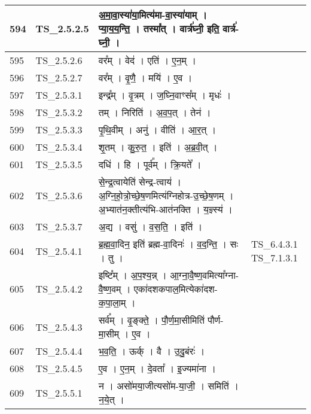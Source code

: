 \documentclass[17pt]{extarticle}
\begin{document}
\begin{longtable}{||p{0.4in}||p{0.9in}||p{4.0in}||p{0.9in}||}
            594 & TS\_2.5.2.5 & अ॒मा॒वा॒स्या॑या॒मित्य॑मा{-}वा॒स्या॑याम्   ।   प्या॒य॒य॒न्ति॒   ।   तस्मा᳚त्   ।   वार्त्र॑घ्नी॒ इति॒ वार्त्र॑{-}घ्नी॒   ।    &      \\
        \hline
            595 & TS\_2.5.2.6 & वर᳚म्   ।   वेद॑   ।   एति॑   ।   ए॒न॒म्   ।    &      \\
        \hline
            596 & TS\_2.5.2.7 & वर᳚म्   ।   वृ॒णै॒   ।   मयि॑   ।   ए॒व   ।    &      \\
        \hline
            597 & TS\_2.5.3.1 & इन्द्र᳚म्   ।   वृ॒त्रम्   ।   ज॒घ्नि॒वाꣳस᳚म्   ।   मृधः॑   ।    &      \\
        \hline
            598 & TS\_2.5.3.2 & तम्   ।   निरिति॑   ।   अ॒व॒प॒त्   ।   तेन॑   ।    &      \\
        \hline
            599 & TS\_2.5.3.3 & पृ॒थि॒वीम्   ।   अनु॑   ।   वीति॑   ।   आ॒र॒त्   ।    &      \\
        \hline
            600 & TS\_2.5.3.4 & शृ॒तम्   ।   कु॒रु॒त॒   ।   इति॑   ।   अ॒ब्र॒वी॒त्   ।    &      \\
        \hline
            601 & TS\_2.5.3.5 & दधि॑   ।   हि   ।   पूर्व᳚म्   ।   क्रि॒यते᳚   ।    &      \\
        \hline
            602 & TS\_2.5.3.6 & से॒न्द्र॒त्वायेति॑ सेन्द्र{-}त्वाय॑   ।   अ॒ग्नि॒हो॒त्रो॒च्छे॒ष॒णमित्य॑ग्निहोत्र{-}उ॒च्छे॒ष॒णम्   ।   अ॒भ्यात॑न॒क्तीत्य॑भि{-}आत॑नक्ति   ।   य॒ज्ञ्स्य॑   ।    &      \\
        \hline
            603 & TS\_2.5.3.7 & अ॒द्य   ।   वसु॑   ।   व॒स॒ति॒   ।   इति॑   ।    &      \\
        \hline
            604 & TS\_2.5.4.1 & ब्र॒ह्म॒वा॒दिन॒ इति॑ ब्रह्म{-}वा॒दिनः॑   ।   व॒द॒न्ति॒   ।   सः   ।   तु   ।    &  TS\_6.4.3.1 TS\_7.1.3.1       \\
        \hline
            605 & TS\_2.5.4.2 & इष्टि᳚म्   ।   अ॒प॒श्य॒न्न्   ।   आ॒ग्ना॒वै॒ष्ण॒वमित्या᳚ग्ना{-}वै॒ष्ण॒वम्   ।   एका॑दशकपाल॒मित्येका॑दश{-}क॒पा॒ला॒म्   ।    &      \\
        \hline
            606 & TS\_2.5.4.3 & सर्व᳚म्   ।   वृ॒ङ्क्ते॒   ।   पौ॒र्ण॒मा॒सीमिति॑ पौर्ण{-}मा॒सीम्   ।   ए॒व   ।    &      \\
        \hline
            607 & TS\_2.5.4.4 & भ॒व॒ति॒   ।   ऊर्क्   ।   वै   ।   उ॒दु॒बंरः॑   ।    &      \\
        \hline
            608 & TS\_2.5.4.5 & ए॒व   ।   ए॒न॒म्   ।   दे॒वता᳚   ।   इ॒ज्यमा॑ना   ।    &      \\
        \hline
            609 & TS\_2.5.5.1 & न   ।   असो॑मया॒जीत्यसो॑म{-}या॒जी॒   ।   समिति॑   ।   न॒ये॒त्   ।    &      \\

\end{longtable}
\end{document}
